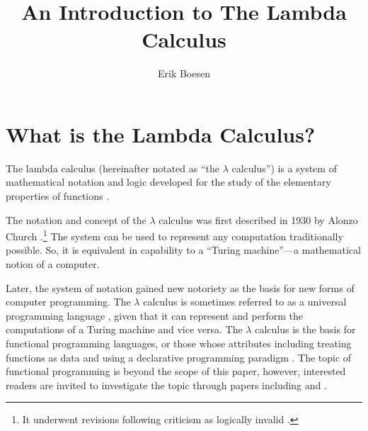 \documentclass{article}
\begin{document}
\title{An Introduction to The Lambda Calculus}
\author{Erik Boesen}
\maketitle

\begin{abstract}
\end{abstract}

\section{What is the Lambda Calculus?}
The lambda calculus (hereinafter notated as ``the $\lambda$ calculus'') is a system of mathematical notation and logic developed for the study of the elementary properties of functions \cite{rojastutorial}.

The notation and concept of the $\lambda$ calculus was first described in 1930 by Alonzo Church \cite{church}.\footnote{It underwent revisions following criticism as logically invalid \cite{church2}.} The system can be used to represent any computation traditionally possible. So, it is equivalent in capability to a ``Turing machine''—a mathematical notion of a computer.

Later, the system of notation gained new notoriety as the basis for new forms of computer programming. The $\lambda$ calculus is sometimes referred to as a universal programming language \cite{rojastutorial}, given that it can represent and perform the computations of a Turing machine and vice versa. The $\lambda$ calculus is the basis for functional programming languages, or those whose attributes including treating functions as data and using a declarative programming paradigm \cite{hudakevolution}. The topic of functional programming is beyond the scope of this paper, however, interested readers are invited to investigate the topic through papers including \cite{totalfp} and \cite{hudakevolution}.
\end{document}
